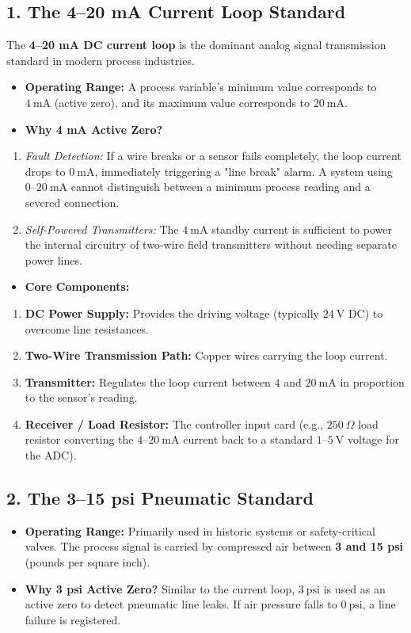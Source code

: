 \subsection{1. The 4–20 mA Current Loop Standard}
The \textbf{4–20 mA DC current loop} is the dominant analog signal transmission standard in modern process industries.
\begin{itemize}
  \item   \textbf{Operating Range:} A process variable's minimum value corresponds to $4\ \text{mA}$ (active zero), and its maximum value corresponds to $20\ \text{mA}$.
  \item   \textbf{Why 4 mA Active Zero?}
\end{itemize}
\begin{enumerate}
  \item \textit{Fault Detection:} If a wire breaks or a sensor fails completely, the loop current drops to $0\ \text{mA}$, immediately triggering a "line break" alarm. A system using $0\text{--}20\ \text{mA}$ cannot distinguish between a minimum process reading and a severed connection.
  \item \textit{Self-Powered Transmitters:} The $4\ \text{mA}$ standby current is sufficient to power the internal circuitry of two-wire field transmitters without needing separate power lines.
\end{enumerate}
\begin{itemize}
  \item   \textbf{Core Components:}
\end{itemize}
\begin{enumerate}
  \item \textbf{DC Power Supply:} Provides the driving voltage (typically $24\ \text{V DC}$) to overcome line resistances.
  \item \textbf{Two-Wire Transmission Path:} Copper wires carrying the loop current.
  \item \textbf{Transmitter:} Regulates the loop current between $4$ and $20\ \text{mA}$ in proportion to the sensor's reading.
  \item \textbf{Receiver / Load Resistor:} The controller input card (e.g., $250\ \Omega$ load resistor converting the $4\text{--}20\ \text{mA}$ current back to a standard $1\text{--}5\ \text{V}$ voltage for the ADC).
\end{enumerate}

\subsection{2. The 3–15 psi Pneumatic Standard}
\begin{itemize}
  \item   \textbf{Operating Range:} Primarily used in historic systems or safety-critical valves. The process signal is carried by compressed air between \textbf{3 and 15 psi} (pounds per square inch).
  \item   \textbf{Why 3 psi Active Zero?} Similar to the current loop, $3\ \text{psi}$ is used as an active zero to detect pneumatic line leaks. If air pressure falls to $0\ \text{psi}$, a line failure is registered.
\end{itemize}

